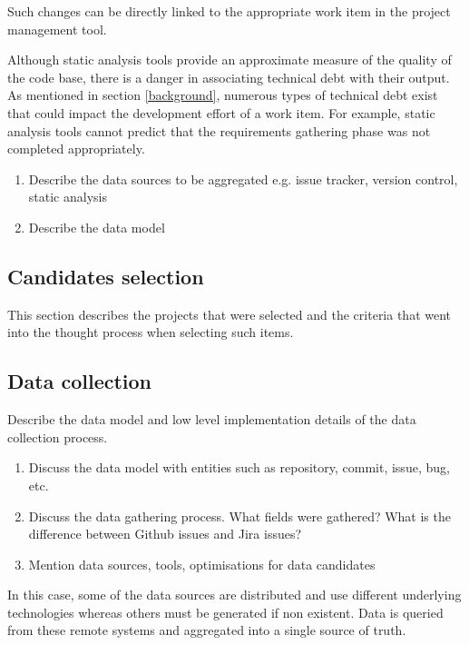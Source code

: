 \documentclass{mpaper}
\begin{document}
Such changes can be directly linked to the appropriate work item in the project
management tool.

Although static analysis tools provide an approximate measure of the quality of
the code base, there is a danger in associating technical debt with their
output. As mentioned in section \ref{background}, numerous types of technical
debt exist that could impact the development effort of a work item. For example,
static analysis tools cannot predict that the requirements gathering phase was
not completed appropriately. 

\begin{enumerate}
  \item Describe the data sources to be aggregated e.g. issue tracker, version
  control, static analysis
  \item Describe the data model
\end{enumerate}

\subsection{Candidates selection}
\label{data-selection}

This section describes the projects that were selected and the criteria that
went into the thought process when selecting such items.

\subsection{Data collection}
\label{data-collection}

Describe the data model and low level implementation details of the data
collection process.

\begin{enumerate}
  \item Discuss the data model with entities such as repository, commit, issue,
  bug, etc. 
  \item Discuss the data gathering process. What fields were gathered? What is
  the difference between Github issues and Jira issues?
  \item Mention data sources, tools, optimisations for data candidates
\end{enumerate}

In this case, some of the data sources are distributed and use
different underlying technologies whereas others must be generated if non
existent. Data is queried from these remote systems and aggregated into a single
source of truth.
\end{document}
